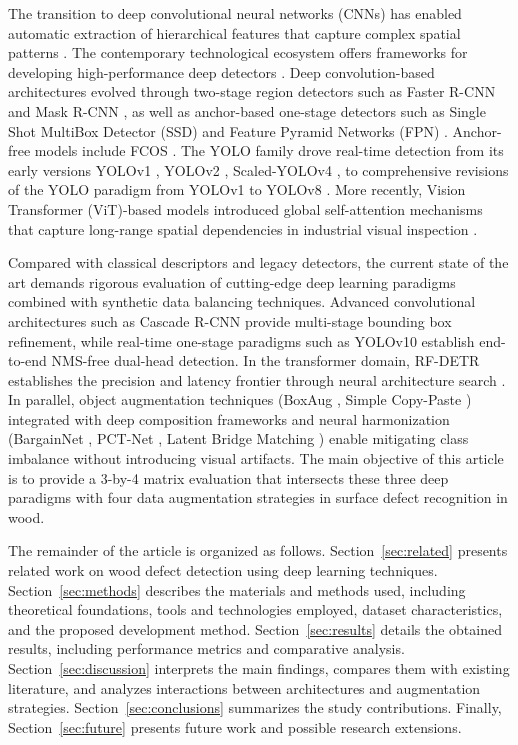 \documentclass[pdflatex,sn-basic,Numbered,iicol]{sn-jnl}
\begin{document}
The transition to deep convolutional neural networks (CNNs) has enabled automatic extraction of hierarchical features that capture complex spatial patterns \citep{alzubaidi2021review}. The contemporary technological ecosystem offers frameworks for developing high-performance deep detectors \citep{jiao2019survey}. Deep convolution-based architectures evolved through two-stage region detectors such as Faster R-CNN \citep{ren2016faster} and Mask R-CNN \citep{he2017mask}, as well as anchor-based one-stage detectors such as Single Shot MultiBox Detector (SSD) \citep{liu2016ssd} and Feature Pyramid Networks (FPN) \citep{lin2017fpn}. Anchor-free models include FCOS \citep{tian2019fcos}. The YOLO family drove real-time detection from its early versions YOLOv1 \citep{redmon2016yolo}, YOLOv2 \citep{redmon2017yolo9000}, Scaled-YOLOv4 \citep{wang2021scaledyolov4}, to comprehensive revisions of the YOLO paradigm from YOLOv1 to YOLOv8 \citep{terven2023yolo,hussain2023yolo}. More recently, Vision Transformer (ViT)-based models introduced global self-attention mechanisms that capture long-range spatial dependencies in industrial visual inspection \citep{hutten2022vision}.

Compared with classical descriptors and legacy detectors, the current state of the art demands rigorous evaluation of cutting-edge deep learning paradigms combined with synthetic data balancing techniques. Advanced convolutional architectures such as Cascade R-CNN \citep{cai2018cascade} provide multi-stage bounding box refinement, while real-time one-stage paradigms such as YOLOv10 \citep{wang2024yolov10} establish end-to-end NMS-free dual-head detection. In the transformer domain, RF-DETR \citep{robinson2026rfdetrneuralarchitecturesearch} establishes the precision and latency frontier through neural architecture search \citep{robinson2026rfdetrneuralarchitecturesearch}. In parallel, object augmentation techniques (BoxAug \citep{LEE2022104138}, Simple Copy-Paste \citep{ghiasi2021simple}) integrated with deep composition frameworks and neural harmonization (BargainNet \citep{cong2021bargainnet}, PCT-Net \citep{Guerreiro_2023_CVPR}, Latent Bridge Matching \citep{chadebec2025lbmlatentbridgematching}) enable mitigating class imbalance without introducing visual artifacts. The main objective of this article is to provide a 3-by-4 matrix evaluation that intersects these three deep paradigms with four data augmentation strategies in surface defect recognition in wood.

The remainder of the article is organized as follows. Section~\ref{sec:related} presents related work on wood defect detection using deep learning techniques. Section~\ref{sec:methods} describes the materials and methods used, including theoretical foundations, tools and technologies employed, dataset characteristics, and the proposed development method. Section~\ref{sec:results} details the obtained results, including performance metrics and comparative analysis. Section~\ref{sec:discussion} interprets the main findings, compares them with existing literature, and analyzes interactions between architectures and augmentation strategies. Section~\ref{sec:conclusions} summarizes the study contributions. Finally, Section~\ref{sec:future} presents future work and possible research extensions.
\end{document}
